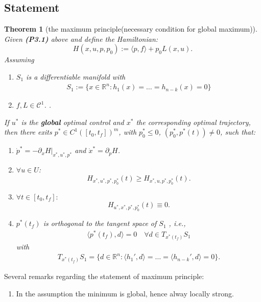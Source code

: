 \documentclass[a4paper,11pt,fleqn]{book}
\newtheorem{theorem}{Theorem}[section]
\theoremstyle{definition}
\theoremstyle{remark}
\begin{document}
\subsection{Statement}
\begin{theorem}[the maximum principle(necessary condition for global maximum)]
Given \textbf{(P3.1)} above and define the Hamiltonian:
\begin{equation}
	H(x, u, p, p_0):= \langle p, f \rangle + p_0 L(x, u). 
\end{equation}
Assuming
\begin{enumerate}
	\item $S_1$ is a differentiable manifold with 
	\begin{align*}
		S_1:= \{x \in \mathbb{R}^n: h_1(x) = \dots = h_{n - k}(x) = 0\}
	\end{align*}
	\item $f, L \in \mathcal{C}^1$.  . 
\end{enumerate}
If $u^*$ is the \textbf{global} optimal control and $x^*$ the corresponding optimal trajectory, then there exits $p^* \in C^1([t_0, t_f])^m$, with $p_0^* \le  0$,  $(p^*_0, p^*(t)) \neq 0$,  such that:
\begin{enumerate}
	\item $\dot{p}^* = - \partial_x H|_{x^*, u^*, p^*}$ and $\dot{x}^* = \partial_p H$. 
	\item $\forall u \in U$: 
	\begin{equation}
		H_{x^*, u^*, p^*, p_0^*}(t) \ge H_{x^*, u, p^*, p_0^*}(t). 
	\end{equation}
	\item $\forall t \in [t_0, t_f]:$
	\begin{equation}
		H_{u^*, x^*, p^*, p_0^*}(t) \equiv 0. 
	\end{equation}
	\item $p^*(t_f)$ is orthogonal to the tangent space of $S_1$ , i.e., 
	\begin{align*}
		\langle p^*(t_f), d \rangle = 0 \quad \forall d \in T_{x^*(t_f)}S_1
	\end{align*}
	with 
	\begin{align*}
		T_{x^*(t_f)}S_1 = \{ d \in \mathbb{R}^n: \langle h_1',  d \rangle = \dots = \langle h_{n - k}', d \rangle = 0 \}. 
	\end{align*}
\end{enumerate}
\end{theorem}

Several remarks regarding the statement of maximum principle:
\begin{enumerate}
	\item In the assumption the minimum is global, hence alway locally strong. 
\end{enumerate}
\end{document}

